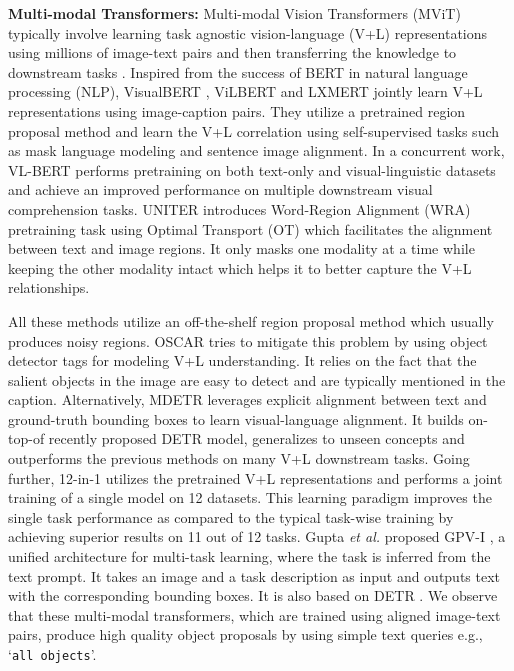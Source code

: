 \documentclass[runningheads]{llncs}
\def\etal{\emph{et al.}\xspace}
\newcommand{\txt}[1]{{\texttt{#1}}}
\begin{document}
\noindent \textbf{Multi-modal Transformers:} Multi-modal Vision Transformers (MViT) typically involve learning task agnostic vision-language (V+L) representations using millions of image-text pairs and then transferring the knowledge to downstream tasks \cite{OSCAR,UNITER,mdetr}. Inspired from the success of BERT \cite{BERT} in natural language processing (NLP), VisualBERT \cite{VisualBERT}, ViLBERT \cite{ViLBERT} and LXMERT \cite{LXMERT} jointly learn V+L representations using image-caption pairs. They utilize a pretrained region proposal method \cite{ren2015faster} and learn the V+L correlation using self-supervised tasks such as mask language modeling and sentence image alignment. 
In a concurrent work, VL-BERT \cite{VL-BERT} performs pretraining on both text-only and visual-linguistic datasets and achieve an improved performance on multiple downstream visual comprehension tasks. UNITER \cite{UNITER} introduces Word-Region Alignment (WRA) pretraining task using Optimal Transport (OT) \cite{OT} which facilitates the alignment between text and image regions. It only masks one modality at a time while keeping the other modality intact which helps it to better capture the V+L relationships. 

All these methods utilize an off-the-shelf region proposal method \cite{ren2015faster} which usually produces noisy regions. OSCAR \cite{OSCAR} tries to mitigate this problem by using object detector tags for modeling V+L understanding. It relies on the fact that the salient objects in the image are easy to detect and are typically mentioned in the caption. Alternatively, MDETR \cite{mdetr} leverages explicit alignment between text and ground-truth bounding boxes to learn visual-language alignment. It builds on-top-of recently proposed DETR \cite{DETR} model, generalizes to unseen concepts and outperforms the previous methods on many V+L downstream tasks.
Going further, 12-in-1 \cite{12-in-1} utilizes the pretrained V+L representations and performs a joint training of a single model on 12 datasets. This learning paradigm improves the single task performance as compared to the typical task-wise training by achieving superior results on 11 out of 12 tasks. Gupta \etal proposed GPV-I \cite{gpv1}, a unified architecture for multi-task learning, where the task is inferred from the text prompt. It takes an image and a task description as input and outputs text with the corresponding bounding boxes. It is also based on DETR \cite{DETR}. We observe that these \cite{mdetr,gpv1} multi-modal transformers, which are trained using aligned image-text pairs, produce high quality object proposals by using simple text queries e.g., ‘\txt{all objects}'.
\end{document}
